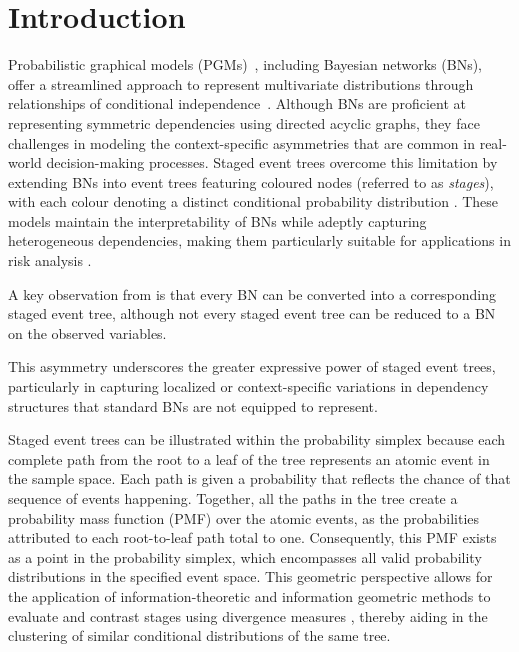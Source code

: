 \documentclass[preprint,12pt]{elsarticle}
\begin{document}


\section{Introduction}
\label{sec1}


Probabilistic graphical models (PGMs)~\cite{lauritzen1996graphical}, including Bayesian networks (BNs), offer a streamlined approach to represent multivariate distributions through relationships of conditional independence~\cite{nagarajan2014bayesian,scutari2021bayesian}. Although BNs are proficient at representing symmetric dependencies using directed acyclic graphs, they face challenges in modeling the context-specific asymmetries that are common in real-world decision-making processes. Staged event trees overcome this limitation by extending BNs into event trees featuring coloured nodes (referred to as \textit{stages}), with each colour denoting a distinct conditional probability distribution \cite{collazo2018chain, smith2008conditional}. These models maintain the interpretability of BNs while adeptly capturing heterogeneous dependencies, making them particularly suitable for applications in risk analysis \cite{varando2024staged}. 



A key observation from \cite{smith2008conditional} is that every BN can be converted into a corresponding staged event tree, although not every staged event tree can be reduced to a BN on the observed variables.

This asymmetry underscores the greater expressive power of staged event trees, particularly in capturing localized or context-specific variations in dependency structures that standard BNs are not equipped to represent.

Staged event trees can be illustrated within the probability simplex because each complete path from the root to a leaf of the tree represents an atomic event in the sample space. Each path is given a probability that reflects the chance of that sequence of events happening. Together, all the paths in the tree create a probability mass function (PMF) over the atomic events, as the probabilities attributed to each root-to-leaf path total to one. Consequently, this PMF exists as a point in the probability simplex, which encompasses all valid probability distributions in the specified event space. This geometric perspective allows for the application of information-theoretic and information geometric methods to evaluate and contrast stages using divergence measures \cite{amari2016information, csiszar2004information}, thereby aiding in the clustering of similar conditional distributions of the same tree.
\end{document}
